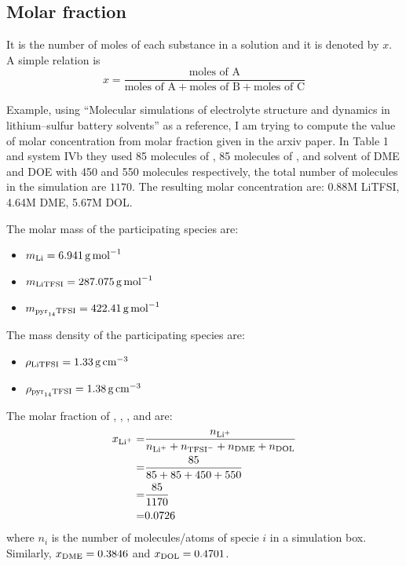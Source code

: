 \documentclass[12pt]{book}
\begin{document}
\subsection{Molar fraction}
It is the number of moles of each substance in a solution and it is denoted by $x$. A simple relation is 
\begin{equation}
x = \frac{\textrm{moles of A}}{\textrm{moles of A} + \textrm{moles of B} + \textrm{moles of C}}
\end{equation}

Example, using ``Molecular simulations of electrolyte structure and dynamics in lithium–sulfur battery solvents'' as a reference, I am trying to compute the value of molar concentration from molar fraction given in the arxiv paper. In Table 1 and system IVb they used 85 molecules of , 85 molecules of , and solvent of DME and DOE with 450 and 550 molecules respectively, the total number of molecules in the simulation are $1170$. The resulting molar concentration are: 0.88M LiTFSI, 4.64M DME, 5.67M DOL.

The molar mass of the participating species are:
\begin{itemize}
\item $m_{\ce{Li}} = \SI{6.941}{\gram\per\mol}$ 
\item $m_{\ce{LiTFSI}} = \SI{287.075}{\gram\per\mol}$ 
\item $m_{\ce{pyr14TFSI}} = \SI{422.41}{\gram\per\mol}$ 
\end{itemize}

The mass density of the participating species are:
\begin{itemize}
\item $\rho_{\ce{LiTFSI}} = \SI{1.33}{\gram\per\centi\meter\cubed}$
\item $\rho_{\ce{pyr14TFSI}} = \SI{1.38}{\gram\per\centi\meter\cubed}$
\end{itemize}

The molar fraction of , , , and  are:
\begin{align}
x_{\ce{Li+}} = & \frac{n_{\ce{Li+}}}{n_{\ce{Li+}} + n_{\ce{TFSI-}} + n_{\ce{DME}} + n_{\ce{DOL}}}\\\nonumber
			 = & \frac{85}{85+85+450+550}\\
             = & \frac{85}{1170} \\
             = & 0.0726
\end{align}
where $n_{i}$ is the number of molecules/atoms of specie $i$ in a simulation box. Similarly,
$x_{\ce{DME}} = 0.3846$ and $x_{\ce{DOL}} = 0.4701$.
\end{document}
